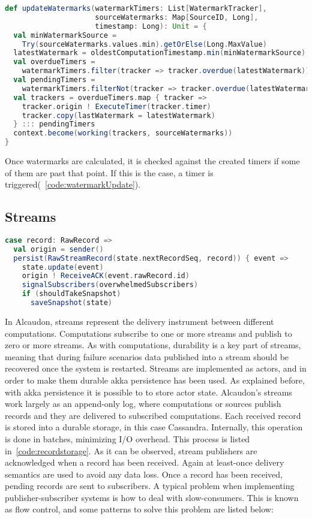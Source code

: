 \begin{lstlisting}[language=scala, frame=trBL, label=code:watermarkUpdate, float=ht, caption = {Watermark update logic}]
def updateWatermarks(watermarkTimers: List[WatermarkTracker],
                     sourceWatermarks: Map[SourceID, Long],
                     timestamp: Long): Unit = {
  val minWatermarkSource =
    Try(sourceWatermarks.values.min).getOrElse(Long.MaxValue)
  latestWatermark = oldestComputationTimestamp.min(minWatermarkSource)
  val overdueTimers =
    watermarkTimers.filter(tracker => tracker.overdue(latestWatermark))
  val pendingTimers =
    watermarkTimers.filterNot(tracker => tracker.overdue(latestWatermark))
  val trackers = overdueTimers.map { tracker =>
    tracker.origin ! ExecuteTimer(tracker.timer)
    tracker.copy(lastWatermark = latestWatermark)
  } ::: pendingTimers
  context.become(working(trackers, sourceWatermarks))
}
\end{lstlisting}

Once watermarks are calculated, it is checked against the created timers if some
of them are past that point. If this is the case, a timer is
triggered(~\ref{code:watermarkUpdate}).

\subsection{Streams}

\begin{lstlisting}[language=scala, frame=trBL, label=code:recordstorage, float=ht, caption = {Stream record storage}]
case record: RawRecord =>
  val origin = sender()
  persist(RawStreamRecord(state.nextRecordSeq, record)) { event =>
    state.update(event)
    origin ! ReceiveACK(event.rawRecord.id)
    signalSubscribers(overwhelmedSubscribers)
    if (shouldTakeSnapshot)
      saveSnapshot(state)
\end{lstlisting}

In Alcaudon, streams represent the delivery instrument between different
computations. Computations subscribe to one or more streams and publish to zero
or more streams. As with computations, durability is a key part of streams,
meaning that during failure scenarios data published into a stream should be
recovered once the system is restarted. Streams are implemented as actors, and in
order to make them durable akka persistence has been used. As explained before,
with akka persistence it is possible to to store actor state. Alcaudon's streams
work largely as an append-only log, where computations or sources publish records
and they are delivered to subscribed computations. Each received record is
stored into a durable storage, in this case Cassandra. Internally, this
operation is done in batches, minimizing I/O overhead. This process is listed
in~\ref{code:recordstorage}. As it can be observed, stream publishers are
acknowledged when a record has been received. Again at least-once delivery
semantics are used to avoid any data loss. Once a record has been received,
pending records are sent to subscribers. A typical problem when implementing
publisher-subscriber systems is how to deal with slow-consumers. This is known as
flow control, and some patterns to solve this problem are listed below: 


